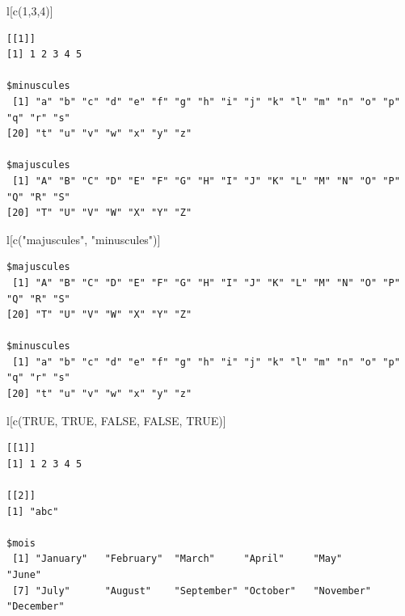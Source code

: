 \documentclass[
  letterpaper,
  DIV=11,
  numbers=noendperiod,
  oneside]{scrreprt}
\newenvironment{Shaded}{\begin{snugshade}}{\end{snugshade}}
\newcommand{\ConstantTok}[1]{\textcolor[rgb]{0.56,0.35,0.01}{#1}}
\newcommand{\DecValTok}[1]{\textcolor[rgb]{0.68,0.00,0.00}{#1}}
\newcommand{\FunctionTok}[1]{\textcolor[rgb]{0.28,0.35,0.67}{#1}}
\newcommand{\NormalTok}[1]{\textcolor[rgb]{0.00,0.23,0.31}{#1}}
\newcommand{\StringTok}[1]{\textcolor[rgb]{0.13,0.47,0.30}{#1}}
\begin{document}
\begin{Shaded}
\begin{Highlighting}[]
\NormalTok{l[}\FunctionTok{c}\NormalTok{(}\DecValTok{1}\NormalTok{,}\DecValTok{3}\NormalTok{,}\DecValTok{4}\NormalTok{)]}
\end{Highlighting}
\end{Shaded}

\begin{verbatim}
[[1]]
[1] 1 2 3 4 5

$minuscules
 [1] "a" "b" "c" "d" "e" "f" "g" "h" "i" "j" "k" "l" "m" "n" "o" "p" "q" "r" "s"
[20] "t" "u" "v" "w" "x" "y" "z"

$majuscules
 [1] "A" "B" "C" "D" "E" "F" "G" "H" "I" "J" "K" "L" "M" "N" "O" "P" "Q" "R" "S"
[20] "T" "U" "V" "W" "X" "Y" "Z"
\end{verbatim}

\begin{Shaded}
\begin{Highlighting}[]
\NormalTok{l[}\FunctionTok{c}\NormalTok{(}\StringTok{"majuscules"}\NormalTok{, }\StringTok{"minuscules"}\NormalTok{)]}
\end{Highlighting}
\end{Shaded}

\begin{verbatim}
$majuscules
 [1] "A" "B" "C" "D" "E" "F" "G" "H" "I" "J" "K" "L" "M" "N" "O" "P" "Q" "R" "S"
[20] "T" "U" "V" "W" "X" "Y" "Z"

$minuscules
 [1] "a" "b" "c" "d" "e" "f" "g" "h" "i" "j" "k" "l" "m" "n" "o" "p" "q" "r" "s"
[20] "t" "u" "v" "w" "x" "y" "z"
\end{verbatim}

\begin{Shaded}
\begin{Highlighting}[]
\NormalTok{l[}\FunctionTok{c}\NormalTok{(}\ConstantTok{TRUE}\NormalTok{, }\ConstantTok{TRUE}\NormalTok{, }\ConstantTok{FALSE}\NormalTok{, }\ConstantTok{FALSE}\NormalTok{, }\ConstantTok{TRUE}\NormalTok{)]}
\end{Highlighting}
\end{Shaded}

\begin{verbatim}
[[1]]
[1] 1 2 3 4 5

[[2]]
[1] "abc"

$mois
 [1] "January"   "February"  "March"     "April"     "May"       "June"     
 [7] "July"      "August"    "September" "October"   "November"  "December" 
\end{verbatim}
\end{document}
